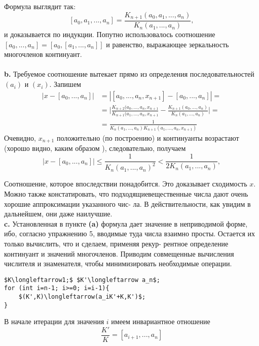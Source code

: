 \documentclass{mai_book}
\begin{document}
\noindent Формула выглядит так:
$$[a_0,a_1,...,a_n]=\frac{K_{n+1}(a_0,a_1,...,a_n)}{K_n(a_1,...,a_n)},$$
и доказывается по индукции. Попутно использовалось соотношение\linebreak
$[a_0,...,a_n]=[a_0,[a_1,...,a_n]]$ и равенство, выражающее зеркальность\linebreak
многочленов континуант.\\
\\
\hspace*{15pt}\textbf{b.} Требуемое соотношение вытекает прямо из определения \linebreak
последовательностей $(a_i)$ и $(x_i)$. Запишем
\begin{equation}
	\begin{split}
		|x-[a_0,...,a_n]|&=|[a_0,...,a_n,x_{n+1}]-[a_0,...,a_n]|=\\
		&=\bigg|\frac{ K_{n+2}(a_0,...,a_n,x_{n+1} }{ K_{n+1}(a_1,...,a_n,x_{n+1} }
		-\frac{ K_{n+1}(a_0,...,a_n) }{K_n(a_1,...,a_n)} \bigg|= \\
		&=\frac{1}{ K_n(a_1,...,a_n)K_{n+1}(a_1,...,a_n,x_{n+1}) }
	\end{split}
\end{equation}
Очевидно, $x_{n+1}$ положительно (по построению) и континуанты возра­стают\linebreak
(хорошо видно, каким образом ), следовательно, получаем
\begin{equation}
	\big|x-[a_0,...,a_n]\big|\leqslant \frac{1}{K_n(a_1,...,a_n)^2}<\frac{1}{2K_n(a_1,...,a_n)},
\end{equation}

\noindent Соотношение, которое впоследствии понадобится. Это доказывает\linebreak 
схо­димость $x$. Можно также констатировать, что подходящие\linebreak веществен­ные числа дают очень хорошие аппроксимации указанного чис-\linebreak
ла. В действительности, как увидим в дальнейшем, они даже наилучшие.\newline
\\
\hspace*{15pt}\textbf{c.} Установленная в пункте \textbf{(a)} формула дает значение в неприводи­мой\linebreak 
форме, ибо, согласно упражнению 5, вводимые туда числа взаимно\linebreak
просты. Остается их только вычислить, что и сделаем, применяя рекур­-\linebreak
рентное определение континуант и значений многочленов. Приводим\linebreak
совмещенные вычисления числителя и знаменателя, чтобы\linebreak 
минимизи­ровать необходимые операции.
\begin{lstlisting}[mathescape=true]
$K\longleftarrow1;$ $K'\longleftarrow a_n$;
for (int i=n-1; i>=0; i=i-1){
	$(K',K)\longleftarrow(a_iK'+K,K')$;
}
\end{lstlisting}
В начале итерации для значения $i$ имеем инвариантное отношение
$$ \frac{K'}{K}=[a_{i+1},...,a_n] $$
\newpage
\end{document}
